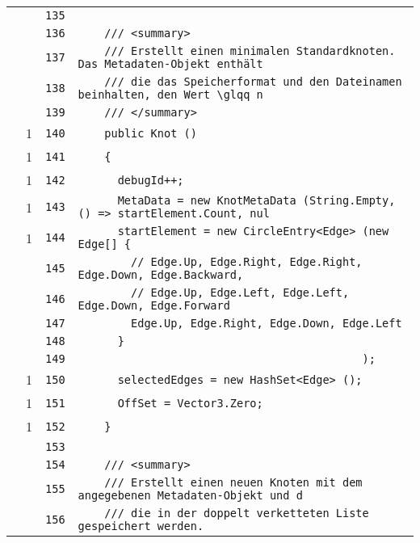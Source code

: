 \documentclass[a4paper,10pt]{article}
\begin{document}
\begin{longtable}[l]{lrrl}
\cellcolor{gray} &  & \verb~135~ & \verb~~\\
\cellcolor{gray} &  & \verb~136~ & \verb~    /// <summary>~\\
\cellcolor{gray} &  & \verb~137~ & \verb~    /// Erstellt einen minimalen Standardknoten. Das Metadaten-Objekt enthält ~\\
\cellcolor{gray} &  & \verb~138~ & \verb~    /// die das Speicherformat und den Dateinamen beinhalten, den Wert \glqq n~\\
\cellcolor{gray} &  & \verb~139~ & \verb~    /// </summary>~\\
\cellcolor{green} & 1 & \verb~140~ & \verb~    public Knot ()~\\
\cellcolor{green} & 1 & \verb~141~ & \verb~    {~\\
\cellcolor{green} & 1 & \verb~142~ & \verb~      debugId++;~\\
\cellcolor{green} & 1 & \verb~143~ & \verb~      MetaData = new KnotMetaData (String.Empty, () => startElement.Count, nul~\\
\cellcolor{green} & 1 & \verb~144~ & \verb~      startElement = new CircleEntry<Edge> (new Edge[] {~\\
\cellcolor{gray} &  & \verb~145~ & \verb~        // Edge.Up, Edge.Right, Edge.Right, Edge.Down, Edge.Backward,~\\
\cellcolor{gray} &  & \verb~146~ & \verb~        // Edge.Up, Edge.Left, Edge.Left, Edge.Down, Edge.Forward~\\
\cellcolor{gray} &  & \verb~147~ & \verb~        Edge.Up, Edge.Right, Edge.Down, Edge.Left~\\
\cellcolor{gray} &  & \verb~148~ & \verb~      }~\\
\cellcolor{gray} &  & \verb~149~ & \verb~                                           );~\\
\cellcolor{green} & 1 & \verb~150~ & \verb~      selectedEdges = new HashSet<Edge> ();~\\
\cellcolor{green} & 1 & \verb~151~ & \verb~      OffSet = Vector3.Zero;~\\
\cellcolor{green} & 1 & \verb~152~ & \verb~    }~\\
\cellcolor{gray} &  & \verb~153~ & \verb~~\\
\cellcolor{gray} &  & \verb~154~ & \verb~    /// <summary>~\\
\cellcolor{gray} &  & \verb~155~ & \verb~    /// Erstellt einen neuen Knoten mit dem angegebenen Metadaten-Objekt und d~\\
\cellcolor{gray} &  & \verb~156~ & \verb~    /// die in der doppelt verketteten Liste gespeichert werden.~\\

\end{longtable}
\end{document}
